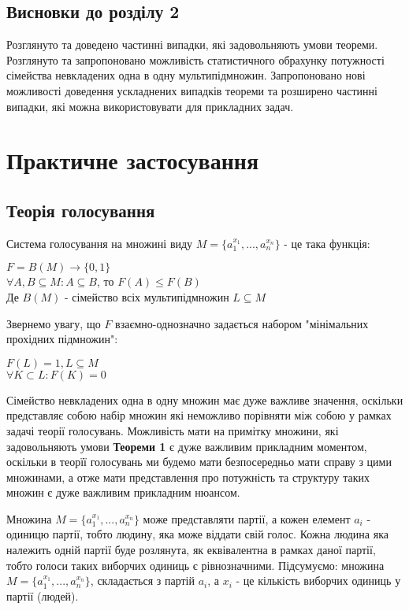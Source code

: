 \section*{Висновки до розділу 2}

	Розглянуто та доведено частинні випадки, які задовольняють умови теореми. Розглянуто та запропоновано можливість статистичного обрахунку потужності сімейства невкладених одна в одну мультипідмножин. Запропоновано нові можливості доведення ускладнених випадків теореми та розширено частинні випадки, які можна використовувати для прикладних задач.
\newpage

\chapter{Практичне застосування}

\section{Теорія голосування}
Система голосування на множині виду $M = \{a_1^{x_1}, ... , a_n^{x_n}\}$ - це така функція:

\begin{center}
$F = B(M) \rightarrow \{0,1\}$
\\
$ \forall A, B \subseteq M: A \subseteq B$, то $F(A) \leq F(B)$ 
\\
Де $B(M)$ - сімейство всіх мультипідмножин $L \subseteq M$
\end{center}

Звернемо увагу, що $F$ взаємно-однозначно задається набором "мінімальних прохідних підмножин":

\begin{center}
$F(L) = 1, L \subseteq M $
\\
$ \forall K \subset L: F(K) = 0$ 
\end{center}

Сімейство невкладених одна в одну множин \cite{my_article:2021} має дуже важливе значення, оскільки представляє собою набір множин які неможливо порівняти між собою у рамках задачі теорії голосувань. Можливість мати на примітку множини, які задовольняють умови {\bf Теореми 1} є дуже важливим прикладним моментом, оскільки в теорїї голосувань ми будемо мати безпосередньо мати справу з цими множинами, а отже мати представлення про потужність та структуру таких множин є дуже важливим прикладним нюансом.

Множина $M = \{a_1^{x_1}, ... , a_n^{x_n}\}$ може представляти партії, а кожен елемент $a_i$ - одиницю партії, тобто людину, яка може віддати свій голос. Кожна людина яка належить одній партії буде розлянута, як еквівалентна в рамках даної партії, тобто голоси таких виборчих одиниць є рівнозначними. Підсумуємо: множина $M = \{a_1^{x_1}, ... , a_n^{x_n}\}$, складається з партій $a_i$, а $x_i$ - це кількість виборчих одиниць у партії (людей).


